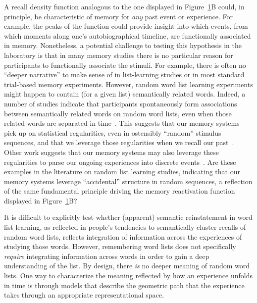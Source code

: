 \documentclass{article}
\begin{document}
\begin{figure}[tp]
\label{fig:reinstatement}
\end{figure}

A recall density function analogous to the one displayed in Figure~\ref{fig:reinstatement}B could, in principle, be characteristic of memory for \textit{any} past event or experience.  For example, the peaks of the function could provide insight into which events, from which moments along one's autobiographical timeline, are functionally associated in memory.  Nonetheless, a potential challenge to testing this hypothesis in the laboratory is that in many memory studies there is no particular reason for participants to functionally associate the stimuli.  For example, there is often no ``deeper narrative'' to make sense of in list-learning studies or in most standard trial-based memory experiments.  However, random word list learning experiments might happen to contain (for a given list) semantically related words.  Indeed, a number of studies indicate that participants spontaneously form associations between semantically related words on random word lists, even when those related words are separated in time~\citep[e.g.,][]{WixtRohr94, MannKaha12, MannEtal12}.  This suggests that our memory systems pick up on statistical regularities, even in ostensibly ``random'' stimulus sequences, and that we leverage those regularities when we recall our past~\citep{PolyEtal09}.  Other work suggests that our memory systems may also leverage these regularities to parse our ongoing experiences into discrete events~\citep{SchaEtal13, Shap19}.  Are these examples in the literature on random list learning studies, indicating that our memory systems leverage ``accidental'' structure in random sequences, a reflection of the same fundamental principle driving the memory reactivation function displayed in Figure~\ref{fig:reinstatement}B?

It is difficult to explicitly test whether (apparent) semantic reinstatement in word list learning, as reflected in people's tendencies to semantically cluster recalls of random word lists, reflects integration of information across the experiences of studying those words.  However, remembering word lists does not specifically \textit{require} integrating information across words in order to gain a deep understanding of the list.  By design, there \textit{is} no deeper meaning of random word lists.  One way to characterize the meaning reflected by how an experience unfolds in time is through models that describe the geometric path that the experience takes through an appropriate representational space.
\end{document}
